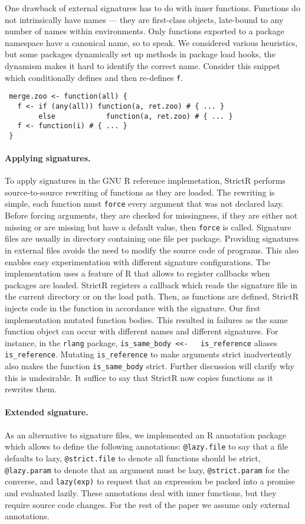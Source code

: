 \documentclass[review,nonacm,screen,acmsmall,anonymous=true]{acmart}
\newcommand{\code}[1]{\lstinline |#1|\xspace}
\renewcommand{\c}[1]{\lstinline |#1|\xspace}
\newcommand{\strictr}{{\sf StrictR}\xspace}
\begin{document}
One drawback of external signatures has to do with inner functions. Functions do
not intrinsically have names --- they are first-class objects, late-bound to any
number of names within environments. Only functions exported to a package
namespace have a canonical name, so to speak. We considered various heuristics,
but some packages dynamically set up methods in package load hooks, the dynamism
makes it hard to identify the correct name. Consider this snippet
which conditionally defines  and then  re-defines \c f.

\begin{lstlisting}
 merge.zoo <- function(all) {
   f <- if (any(all)) function(a, ret.zoo) # { ... }
        else            function(a, ret.zoo) # { ... }
   f <- function(i) # { ... }
 }
\end{lstlisting}

\paragraph{Applying signatures.}
To apply signatures in the GNU R reference implemetation, \strictr performs
source-to-source rewriting of functions as they are loaded. The rewriting is
simple, each function must \c{force} every argument that was not declared lazy.
Before forcing arguments, they are checked for missingness, if they are either
not missing or are missing but have a default value, then \c{force} is called.
Signature files are usually in directory containing one file per package.
Providing signatures in external files avoids the need to modify the source code
of programs. This also enables easy experimentation with different signature
configurations. The implementation uses a feature of R that allows to register
callbacks when packages are loaded. \strictr registers a callback which reads
the signature file in the current directory or on the load path. Then, as
functions are defined, \strictr injects code in the function in accordance with
the signature.
Our first implementation mutated function bodies. This resulted in failures as
the same function object can occur with different names and different
signatures. For instance, in the \code{rlang} package, \code{is_same_body <<-
  is_reference} aliases \code{is_reference}. Mutating \code{is_reference} to
make arguments strict inadvertently also makes the function \code{is_same_body}
strict. Further discussion will clarify why this is undesirable. It suffice to
say that \strictr now copies functions as it rewrites them.

\paragraph{Extended signature.}
As an alternative to signature files, we implemented an R annotation package
which allows to define the following annotations: \c{@lazy.file} to say that a
file defaults to lazy, \c{@strict.file} to denote all functions should be
strict, \c{@lazy.param} to denote that an argument must be lazy,
\c{@strict.param} for the converse, and \c{lazy(exp)} to request that an
expression be packed into a promise and evaluated lazily. These annotations deal
with inner functions, but they require source code changes. For the rest of the
paper we assume only external annotations.
\end{document}
